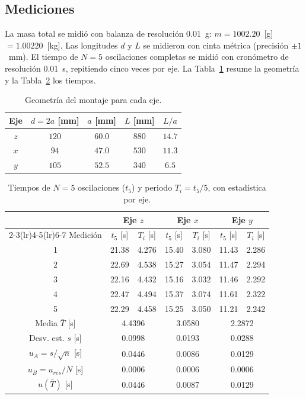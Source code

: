 \subsection*{Mediciones}
La masa total se midió con balanza de resolución 0.01~g: $m=1002.20$~[g] $=1.00220$~[kg]. Las longitudes $d$ y $L$ se midieron con cinta métrica (precisión $\pm1$~mm). El tiempo de $N=5$ oscilaciones completas se midió con cronómetro de resolución 0.01~s, repitiendo cinco veces por eje. La Tabla~\ref{tab:geom} resume la geometría y la Tabla~\ref{tab:tiempos} los tiempos.

\begin{table}[H]
\centering
\caption{Geometría del montaje para cada eje.}\label{tab:geom}
\begin{tabular}{ccccc}
\toprule
Eje & $d=2a$ [mm] & $a$ [mm] & $L$ [mm] & $L/a$ \\
\midrule
$z$ & $120$ & $60.0$ & $880$ & $14.7$ \\
$x$ & $94$ & $47.0$ & $530$ & $11.3$ \\
$y$ & $105$ & $52.5$ & $340$ & $6.5$ \\
\bottomrule
\end{tabular}
\end{table}

\begin{table}[H]
\centering
\caption{Tiempos de $N=5$ oscilaciones ($t_5$) y periodo $T_i=t_5/5$, con estadística por eje.}\label{tab:tiempos}
\small
\begin{tabular}{c cc cc cc}
\toprule
 & \multicolumn{2}{c}{Eje $z$} & \multicolumn{2}{c}{Eje $x$} & \multicolumn{2}{c}{Eje $y$} \\
\cmidrule(lr){2-3}\cmidrule(lr){4-5}\cmidrule(lr){6-7}
Medición & $t_5$ [s] & $T_i$ [s] & $t_5$ [s] & $T_i$ [s] & $t_5$ [s] & $T_i$ [s] \\
\midrule
1 & 21.38 & 4.276 & 15.40 & 3.080 & 11.43 & 2.286 \\
2 & 22.69 & 4.538 & 15.27 & 3.054 & 11.47 & 2.294 \\
3 & 22.16 & 4.432 & 15.16 & 3.032 & 11.46 & 2.292 \\
4 & 22.47 & 4.494 & 15.37 & 3.074 & 11.61 & 2.322 \\
5 & 22.29 & 4.458 & 15.25 & 3.050 & 11.21 & 2.242 \\
\midrule
Media $\bar T$ [s] & \multicolumn{2}{c}{4.4396} & \multicolumn{2}{c}{3.0580} & \multicolumn{2}{c}{2.2872} \\
Desv. est. $s$ [s] & \multicolumn{2}{c}{0.0998} & \multicolumn{2}{c}{0.0193} & \multicolumn{2}{c}{0.0288} \\
$u_A=s/\sqrt{n}$ [s] & \multicolumn{2}{c}{0.0446} & \multicolumn{2}{c}{0.0086} & \multicolumn{2}{c}{0.0129} \\
$u_B=u_{res}/N$ [s] & \multicolumn{2}{c}{0.0006} & \multicolumn{2}{c}{0.0006} & \multicolumn{2}{c}{0.0006} \\
$u(\bar T)$ [s] & \multicolumn{2}{c}{0.0446} & \multicolumn{2}{c}{0.0087} & \multicolumn{2}{c}{0.0129} \\
\bottomrule
\end{tabular}
\end{table}

